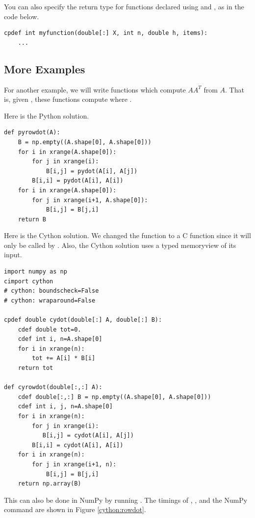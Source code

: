 You can also specify the return type for functions declared using  and , as in the code below.
\begin{lstlisting}
cpdef int myfunction(double[:] X, int n, double h, items):
    ...
\end{lstlisting}

\subsection*{More Examples}
For another example, we will write functions which compute $AA^T$ from $A$.
That is, given , these functions compute  where
.

Here is the Python solution.
\begin{lstlisting}
def pyrowdot(A):
    B = np.empty((A.shape[0], A.shape[0]))
    for i in xrange(A.shape[0]):
        for j in xrange(i):
            B[i,j] = pydot(A[i], A[j])
        B[i,i] = pydot(A[i], A[i])
    for i in xrange(A.shape[0]):
        for j in xrange(i+1, A.shape[0]):
            B[i,j] = B[j,i]
    return B
\end{lstlisting}

Here is the Cython solution. 
We changed the function  to a C function since it will only be called by .
Also, the Cython solution uses a typed memoryview of its input.

\begin{lstlisting}
import numpy as np
cimport cython
# cython: boundscheck=False
# cython: wraparound=False

cpdef double cydot(double[:] A, double[:] B):
    cdef double tot=0.
    cdef int i, n=A.shape[0]
    for i in xrange(n):
        tot += A[i] * B[i]
    return tot

def cyrowdot(double[:,:] A):
    cdef double[:,:] B = np.empty((A.shape[0], A.shape[0]))
    cdef int i, j, n=A.shape[0]
    for i in xrange(n):
        for j in xrange(i):
           B[i,j] = cydot(A[i], A[j])
        B[i,i] = cydot(A[i], A[i])
    for i in xrange(n):
        for j in xrange(i+1, n):
            B[i,j] = B[j,i]
    return np.array(B)
\end{lstlisting}

This can also be done in NumPy by running .
The timings of , , and the NumPy command  are shown in Figure \ref{cython:rowdot}.

